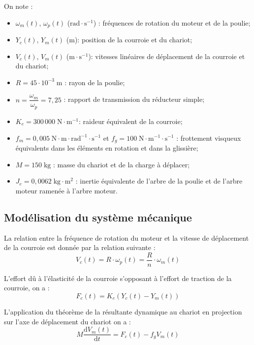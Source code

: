 \documentclass[10pt,fleqn]{article} %
\begin{document}
\begin{multicols}{2}
On note : 
\begin{itemize}[label=$\blacksquare$,font=\tiny]
\item $\omega_m(t)$, $\omega_p(t)$ ($\text{rad}\cdot \text{s}^{-1}$) : fréquences de rotation du moteur et de la poulie;
\item $Y_c(t)$, $Y_m(t)$ ($\text{m}$): position de la courroie et du chariot;
\item $V_c(t)$, $V_m(t)$ ($\text{m}\cdot \text{s}^{-1}$): vitesses linéaires de déplacement de la courroie et du chariot;
\item $R =45\cdot 10^{-3} \; \text{m}$ : rayon de la poulie;
\item $n=\dfrac{\omega_m}{\omega_p} = 7,25$ : rapport de transmission du réducteur simple;
\item $K_e = 300\, 000 \; \text{N}\cdot \text{m}^{-1} $: raideur équivalent de la courroie;
\item $f_m = 0,005\; \text{N}\cdot\text{m}\cdot\text{rad}^{-1}\cdot\text{s}^{-1}$ et $f_g = 100\; \text{N}\cdot\text{m}^{-1}\cdot\text{s}^{-1}$ : frottement visqueux équivalents dans les éléments en rotation et dans la glissière;
\item $M = 150 \; \text{kg}$ : masse du chariot et de la charge à déplacer;
\item $J_e = 0,0062 \; \text{kg} \cdot \text{m}^2 $ : inertie équivalente de l'arbre de la poulie et de l'arbre moteur ramenée à l'arbre moteur.
\end{itemize}
\fi

\subsection*{Modélisation du système mécanique}
\ifprof
\else
La relation entre la fréquence de rotation du moteur et la vitesse de déplacement de la courroie est donnée par la relation suivante :
\begin{equation}
V_c(t) = R \cdot  \omega_p(t) = \dfrac{R}{n} \cdot \omega_m(t)
\end{equation}



L'effort dû à l'élasticité de la courroie s'opposant à l'effort de traction de la courroie, on a :
\begin{equation}
F_c(t) = K_e \left(Y_c(t) - Y_m(t) \right)
\end{equation}

L'application du théorème de la résultante dynamique au chariot en projection sur l'axe de déplacement du chariot on a : 
\begin{equation}
M\dfrac{\text{d}V_m(t)}{\text{d}t} = F_c(t) - f_g V_m(t)
\end{equation}


\end{multicols}
\end{document}
